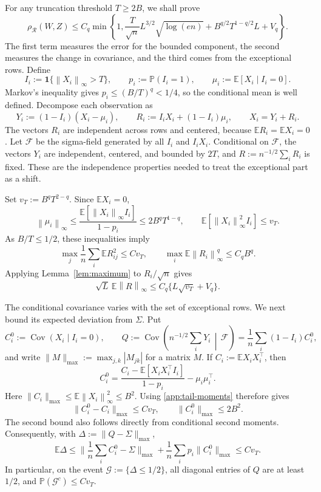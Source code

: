 \documentclass[11pt,letterpaper]{article}
\theoremstyle{remark}
\newcommand{\E}{\mathbb E}
\newcommand{\Pp}{\mathbb P}
\newcommand{\Cov}{\operatorname{Cov}}
\newcommand{\norm}[1]{\left\lVert#1\right\rVert}
\newcommand{\maxnorm}[1]{\lVert#1\rVert_{\max}}
\newcommand{\rh}{\rho_{\mathcal R}}
\newcommand{\ind}{\mathbf 1}
\begin{document}
For any truncation threshold \(T\ge2B\), we shall prove
\begin{equation}
 \rh(W,Z)\le C_q\min\left\{1,
 \frac{T}{\sqrt n}L^{3/2}\sqrt{\log(en)}
 +B^{q/2}T^{1-q/2}L+V_q\right\}.
 \label{poly:threshold}
\end{equation}
The first term measures the error for the bounded component, the
second measures the change in covariance, and the third comes from
the exceptional rows. Define
\[
 I_i:=\ind\{\norm{X_i}_\infty>T\},\qquad
 p_i:=\Pp(I_i=1),\qquad \mu_i:=\E[X_i\mid I_i=0].
\]
Markov's inequality gives \(p_i\le(B/T)^q<1/4\), so the conditional
mean is well defined. Decompose each observation as
\begin{equation}
 Y_i:=(1-I_i)(X_i-\mu_i),\qquad
 R_i:=I_iX_i+(1-I_i)\mu_i,\qquad X_i=Y_i+R_i.
 \label{app:decomposition}
\end{equation}
The vectors \(R_i\) are independent across rows and centered, because
\(\E R_i=\E X_i=0\). Let \(\mathcal F\) be the sigma-field generated
by all \(I_i\) and \(I_iX_i\). Conditional on \(\mathcal F\), the
vectors \(Y_i\) are independent, centered, and bounded by \(2T\),
and \(R:=n^{-1/2}\sum_iR_i\) is fixed. These are the independence
properties needed to treat the exceptional part as a shift.

Set \(v_T:=B^qT^{2-q}\). Since \(\E X_i=0\),
\begin{equation}
 \norm{\mu_i}_\infty
 \le\frac{\E[\norm{X_i}_\infty I_i]}{1-p_i}
 \le2B^qT^{1-q},\qquad
 \E[\norm{X_i}_\infty^2 I_i]\le v_T.
 \label{app:tail-moments}
\end{equation}
As \(B/T\le1/2\), these inequalities imply
\[
 \max_j\frac1n\sum_i\E R_{ij}^2\le C v_T,\qquad
 \max_i\E\norm{R_i}_\infty^q\le C_qB^q.
\]
Applying Lemma~\ref{lem:maximum} to \(R_i/\sqrt n\) gives
\begin{equation}
 \sqrt L\,\E\norm R_\infty
 \le C_q\{L\sqrt{v_T}+V_q\}.
 \label{app:shift}
\end{equation}

The conditional covariance varies with the set of exceptional rows.
We next bound its expected deviation from \(\Sigma\). Put
\[
 C_i^0:=\Cov(X_i\mid I_i=0),\qquad
 Q:=\Cov\left(n^{-1/2}\sum_iY_i\,\middle|\,\mathcal F\right)
   =\frac1n\sum_i(1-I_i)C_i^0,
\]
and write \(\maxnorm M:=\max_{j,k}|M_{jk}|\) for a matrix \(M\).
If \(C_i:=\E X_iX_i^\top\), then
\[
 C_i^0=\frac{C_i-\E[X_iX_i^\top I_i]}{1-p_i}
          -\mu_i\mu_i^\top.
\]
Here \(\maxnorm{C_i}\le\E\norm{X_i}_\infty^2\le B^2\).
Using \eqref{app:tail-moments} therefore gives
\[
 \maxnorm{C_i^0-C_i}\le C v_T,
 \qquad \maxnorm{C_i^0}\le2B^2.
\]
The second bound also follows directly from conditional second moments.
Consequently, with \(\Delta:=\maxnorm{Q-\Sigma}\),
\begin{equation}
 \E\Delta
 \le\maxnorm{\frac1n\sum_i C_i^0-\Sigma}
       +\frac1n\sum_i p_i\maxnorm{C_i^0}
 \le C v_T.
 \label{app:conditional-covariance}
\end{equation}
In particular, on the event \(\mathcal G:=\{\Delta\le1/2\}\), all
diagonal entries of \(Q\) are at least \(1/2\), and
\(\Pp(\mathcal G^c)\le C v_T\).
\end{document}
